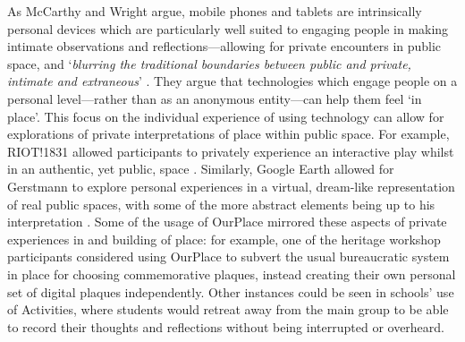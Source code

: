 As McCarthy and Wright argue, mobile phones and tablets are intrinsically personal devices which are particularly well suited to engaging people in making intimate observations and reflections---allowing for private encounters in public space, and `\textit{blurring the traditional boundaries between public and private, intimate and extraneous}' \citep{McCarthy2005}. They argue that technologies which engage people on a personal level---rather than as an anonymous entity---can help them feel `in place'. This focus on the individual experience of using technology can allow for explorations of private interpretations of place within public space. For example, RIOT!1831 allowed participants to privately experience an interactive play whilst in an authentic, yet public, space \citep{Blythe2006}. Similarly, Google Earth allowed for Gerstmann to explore personal experiences in a virtual, dream-like representation of real public spaces, with some of the more abstract elements being up to his interpretation \citep{Gerstmann2016}. Some of the usage of OurPlace mirrored these aspects of private experiences in and building of place: for example, one of the heritage workshop participants considered using OurPlace to subvert the usual bureaucratic system in place for choosing commemorative plaques, instead creating their own personal set of digital plaques independently. Other instances could be seen in schools' use of Activities, where students would retreat away from the main group to be able to record their thoughts and reflections without being interrupted or overheard. 

